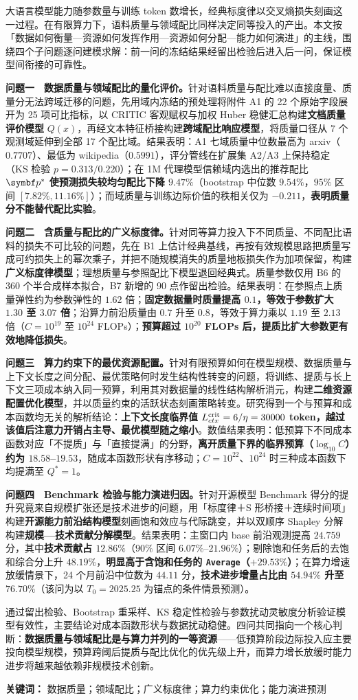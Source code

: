 大语言模型能力随参数量与训练 token 数增长，经典标度律以交叉熵损失刻画这一过程。在有限算力下，语料质量与领域配比同样决定同等投入的产出。本文按「数据如何衡量—资源如何发挥作用—资源如何分配—能力如何演进」的主线，围绕四个子问题逐问建模求解：前一问的冻结结果经留出检验后进入后一问，保证模型间衔接的可靠性。

\textbf{问题一　数据质量与领域配比的量化评价。}针对语料质量与配比难以直接度量、质量分无法跨域迁移的问题，先用域内冻结的预处理将附件 A1 的 22 个原始字段展开为 25 项可比指标，以 CRITIC 客观赋权与加权 Huber 稳健汇总构建\textbf{文档质量评价模型} $Q(x)$，再经文本特征桥接构建\textbf{跨域配比响应模型}，将质量口径从 7 个观测域延伸到全部 17 个配比域。结果表明：A1 七域质量中位数最高为 arxiv（$0.7707$）、最低为 wikipedia（$0.5991$），评分管线在扩展集 A2/A3 上保持稳定（KS 检验 $p=0.313/0.220$）；在 1M 代理模型信赖域内选出的推荐配比 $\bp^*$ \textbf{使预测损失较均匀配比下降 $9.47\%$}（bootstrap 中位数 $9.54\%$，$95\%$ 区间 $[7.82\%,11.16\%]$）；而域质量与训练边际价值的秩相关仅为 $-0.211$，\textbf{表明质量分不能替代配比实验}。

\textbf{问题二　含质量与配比的广义标度律。}针对同等算力投入下不同质量、不同配比语料的损失不可比较的问题，先在 B1 上估计经典基线，再按有效规模思路把质量写成可约损失上的幂次乘子，并把不随规模消失的质量地板损失作为加项保留，构建\textbf{广义标度律模型}；理想质量与参照配比下模型退回经典式。质量参数仅用 B6 的 360 个半合成样本拟合，B7 新增的 90 点作留出检验。结果表明：在参照点上质量弹性约为参数弹性的 $1.62$ 倍；\textbf{固定数据量时质量提高 $0.1$，等效于参数扩大 $1.30$ 至 $3.07$ 倍}；沿算力前沿质量由 $0.7$ 升至 $0.8$，等效于算力乘以 $1.19$ 至 $2.13$ 倍（$C=10^{19}$ 至 $10^{24}$ FLOPs）；\textbf{预算超过 $10^{20}$ FLOPs 后，提质比扩大参数更有效地降低损失}。

\textbf{问题三　算力约束下的最优资源配置。}针对有限预算如何在模型规模、数据质量与上下文长度之间分配、最优策略何时发生结构性转变的问题，将训练、提质与长上下文三项成本纳入同一预算，利用其对数据量的线性结构解析消元，构建\textbf{二维资源配置优化模型}，并以质量约束的活跃状态刻画策略转变。研究得到一个与预算和成本函数均无关的解析结论：\textbf{上下文长度临界值 $L_{ctx}^{\rm crit}=6/\eta=30000$ token，越过该值后注意力开销占主导、最优模型随之缩小}。数值结果表明：低预算下不同成本函数对应「不提质」与「直接提满」的分野，\textbf{离开质量下界的临界预算（$\log_{10}C$）约为 $18.58$--$19.53$}，随成本函数形状有序移动；$C=10^{22}$、$10^{24}$ 时三种成本函数下均提满至 $Q^*=1$。

\textbf{问题四　Benchmark 检验与能力演进归因。}针对开源模型 Benchmark 得分的提升究竟来自规模扩张还是技术进步的问题，用「标度律＋S 形桥接＋连续时间项」构建\textbf{开源能力前沿结构模型}刻画饱和效应与代际跳变，并以双顺序 Shapley 分解构建\textbf{规模—技术贡献分解模型}。结果表明：主窗口内 base 前沿观测提高 $24.759$ 分，其中\textbf{技术贡献占 $12.86\%$}（$90\%$ 区间 $6.07\%$--$21.96\%$）；剔除饱和任务后的去饱和综合分上升 $48.19\%$，\textbf{明显高于含饱和任务的 \texttt{Average}（$+29.53\%$）}；在算力增速放缓情景下，24 个月前沿中位数为 $44.11$ 分，\textbf{技术进步增量占比由 $54.94\%$ 升至 $76.70\%$}（该问为以 $T_0=2025.25$ 为锚点的条件情景预测）。

通过留出检验、Bootstrap 重采样、KS 稳定性检验与参数扰动灵敏度分析验证模型有效性，主要结论对成本函数形状与数据扰动稳健。四问共同指向一个核心判断：\textbf{数据质量与领域配比是与算力并列的一等资源}——低预算阶段边际投入应主要投向模型规模，预算跨阈后提质与配比优化的优先级上升，而算力增长放缓时能力进步将越来越依赖非规模技术创新。

\textbf{关键词：} 数据质量；领域配比；广义标度律；算力约束优化；能力演进预测
